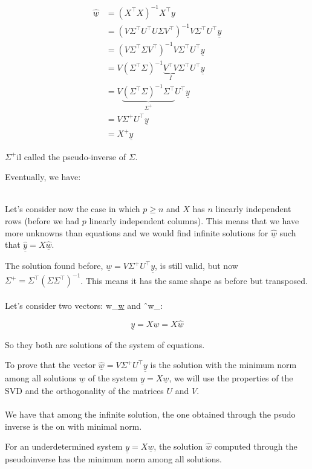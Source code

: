 $$
\begin{aligned}
\underline{\hat{w}} & =\left(X^{\top} X\right)^{-1} X^{\top} y \\
& =\left(V \Sigma^{\top} U^{\top} U \Sigma V^{\top}\right)^{-1} V \Sigma^{\top} U^{\top} \underline{y} \\
& =\left(V \Sigma^{\top} \Sigma V^{\top}\right)^{-1} V \Sigma^{\top} U^{\top} \underline{y} \\
& =V\left(\Sigma^{\top} \Sigma\right)^{-1} \underbrace{V^{\top} V}_{I} \Sigma^{\top} U^{\top} \underline{y} \\
& = V\underbrace{\left(\Sigma^{\top} \Sigma\right)^{-1} \Sigma^{\top}}_{\Sigma^{+}} U^{\top} \underline{y} \\
& = V\Sigma^{+} U^{\top} \underline{y} \\
& = X^{+}\underline{y}
\end{aligned}
$$


$\Sigma^{+}$il called the pseudo-inverse of $\Sigma$.

Eventually, we have:


\\
Let's consider now the case in which \( p \geq n \) and \( X \) has \( n \) linearly independent rows (before we had \( p \) linearly independent columns). This means that we have more unknowns than equations and we would find infinite solutions for \(\underline{\hat{w}}\) such that \(\underline{\hat{y}} = X \underline{\hat{w}}\).

The solution found before, \(\underline{\hat{w}} = V \Sigma^{+} U^{\top} \underline{y}\), is still valid, but now \(\Sigma^{+} = \Sigma^{\top} (\Sigma \Sigma^{\top})^{-1}\). This means it has the same shape as before but transposed. \\ \\
Let's consider two vectors: w_\underline{w} and ˆw_\underline{}:

\[
\underline{y} = X \underline{w} = X \underline{\hat{w}}
\]

So they both are solutions of the system of equations.

To prove that the vector \(\underline{\hat{w}} = V \Sigma^{+} U^{\top} \underline{y}\) is the solution with the minimum norm among all solutions \(\underline{w}\) of the system \(\underline{y} = X \underline{w}\), we will use the properties of the SVD and the orthogonality of the matrices \(U\) and \(V\).\\ \\
We have that among the infinite solution, the one obtained through the psudo inverse is the on with minimal norm. \\
\begin{theorem}
For an underdetermined system $\underline{y} = X\underline{w}$, the solution $\hat{w}$ computed through the pseudoinverse has the minimum norm among all solutions.
\end{theorem}

